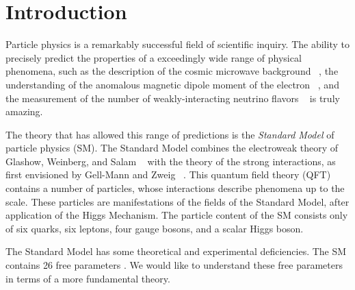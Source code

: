 
\chapter{Introduction}
\label{ch:intro}

Particle physics is a remarkably successful field of scientific inquiry.
The ability to precisely predict the properties of a exceedingly wide range of physical phenomena, such as the description of the cosmic microwave background ~\cite{Perdereau:2016akt,Aghanim:2016sns}, the understanding of the anomalous magnetic dipole moment of the electron ~\cite{Schwinger:1948iu, Laporta:1996mq}, and the measurement of the number of weakly-interacting neutrino flavors ~\cite{ALEPH:2005ab} is truly amazing.

The theory that has allowed this range of predictions is the \textit{Standard Model} of particle physics (SM).
The Standard Model combines the electroweak theory of Glashow, Weinberg, and Salam ~\cite{Glashow:1961tr, Weinberg:1967tq,  Salam:1968rm} with the theory of the strong interactions, as first envisioned by Gell-Mann and Zweig ~\cite{GellMann:1964nj, Zweig:1964jf}.
This quantum field theory (QFT) contains a number of particles, whose interactions describe phenomena up to the \TeV\xspace scale.
These particles are manifestations of the fields of the Standard Model, after application of the Higgs Mechanism.
The particle content of the SM consists only of six quarks, six leptons, four gauge bosons, and a scalar Higgs boson.

The Standard Model has some theoretical and experimental deficiencies.
The SM contains 26 free parameters \footnotemark.
We would like to understand these free parameters in terms of a more fundamental theory.

